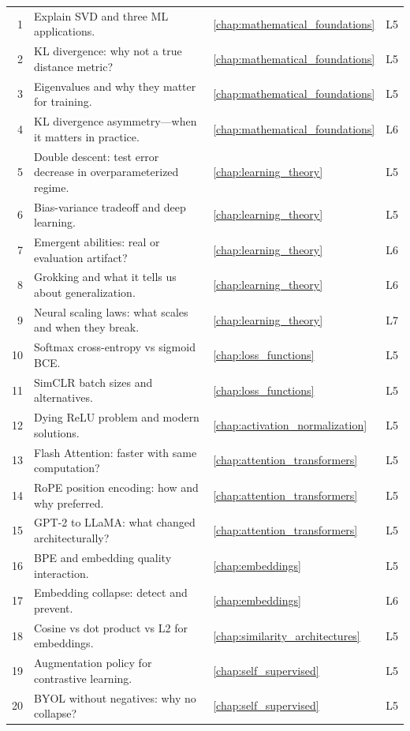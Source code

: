\begin{longtable}{rp{8.5cm}ll}
1 & Explain SVD and three ML applications. & \ref{chap:mathematical_foundations} & L5 \\
2 & KL divergence: why not a true distance metric? & \ref{chap:mathematical_foundations} & L5 \\
3 & Eigenvalues and why they matter for training. & \ref{chap:mathematical_foundations} & L5 \\
4 & KL divergence asymmetry---when it matters in practice. & \ref{chap:mathematical_foundations} & L6 \\
5 & Double descent: test error decrease in overparameterized regime. & \ref{chap:learning_theory} & L5 \\
6 & Bias-variance tradeoff and deep learning. & \ref{chap:learning_theory} & L5 \\
7 & Emergent abilities: real or evaluation artifact? & \ref{chap:learning_theory} & L6 \\
8 & Grokking and what it tells us about generalization. & \ref{chap:learning_theory} & L6 \\
9 & Neural scaling laws: what scales and when they break. & \ref{chap:learning_theory} & L7 \\
10 & Softmax cross-entropy vs sigmoid BCE. & \ref{chap:loss_functions} & L5 \\
11 & SimCLR batch sizes and alternatives. & \ref{chap:loss_functions} & L5 \\
12 & Dying ReLU problem and modern solutions. & \ref{chap:activation_normalization} & L5 \\
13 & Flash Attention: faster with same computation? & \ref{chap:attention_transformers} & L5 \\
14 & RoPE position encoding: how and why preferred. & \ref{chap:attention_transformers} & L5 \\
15 & GPT-2 to LLaMA: what changed architecturally? & \ref{chap:attention_transformers} & L5 \\
16 & BPE and embedding quality interaction. & \ref{chap:embeddings} & L5 \\
17 & Embedding collapse: detect and prevent. & \ref{chap:embeddings} & L6 \\
18 & Cosine vs dot product vs L2 for embeddings. & \ref{chap:similarity_architectures} & L5 \\
19 & Augmentation policy for contrastive learning. & \ref{chap:self_supervised} & L5 \\
20 & BYOL without negatives: why no collapse? & \ref{chap:self_supervised} & L5 \\

\end{longtable}

